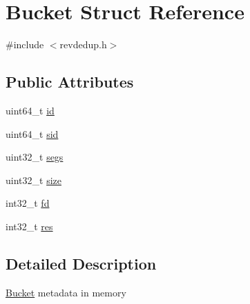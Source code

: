 \hypertarget{structBucket}{\section{\-Bucket \-Struct \-Reference}
\label{structBucket}
}


{\ttfamily \#include $<$revdedup.\-h$>$}

\subsection*{\-Public \-Attributes}
\begin{DoxyCompactItemize}
\item 
uint64\-\_\-t \hyperlink{structBucket_abb66360bd620404d05f1bb9212ff0583}{id}
\item 
uint64\-\_\-t \hyperlink{structBucket_a33a6eab0fcb280fa539c161564302c37}{sid}
\item 
uint32\-\_\-t \hyperlink{structBucket_ac691a63259aba90e9cd52c00c218a5ee}{segs}
\item 
uint32\-\_\-t \hyperlink{structBucket_af05cc6d1be2cce6c1b1c43c2a8df8071}{size}
\item 
int32\-\_\-t \hyperlink{structBucket_a56132451660649a4d77631b22b48b0c7}{fd}
\item 
int32\-\_\-t \hyperlink{structBucket_a857c526f6e8e0a89e2d065ae41da637c}{res}
\end{DoxyCompactItemize}


\subsection{\-Detailed \-Description}
\hyperlink{structBucket}{\-Bucket} metadata in memory 

